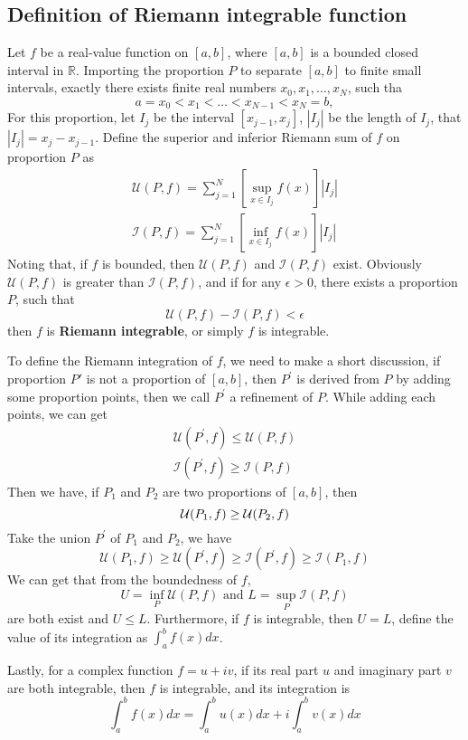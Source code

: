 \documentclass[a4paper]{article}
\begin{document}
\subsection{Definition of Riemann integrable function}
\par Let $f$ be a real-value function on $[a,b]$, where $[a,b]$ is a bounded closed interval in $\mathbb{R}$. Importing the proportion $P$ to separate $[a,b]$ to finite small intervals, exactly there exists finite real numbers $x_0, x_1, \dots, x_N$, such tha
$$a=x_0 < x_1 < \dots < x_{N-1} < x_N=b,$$
For this proportion, let $I_j$ be the interval $[x_{j-1},x_j]$, $|I_j|$ be the length of $I_j$, that $|I_j|=x_j-x_{j-1}$. Define the superior and inferior Riemann sum of $f$ on proportion $P$ as
\begin{gather}
    \mathcal{U}(P, f) = \sum_{j=1}^N [\sup_{x \in I_j} f(x)]|I_j| \\
    \mathcal{I}(P, f) = \sum_{j=1}^N [\inf_{x \in I_j} f(x)]|I_j|
\end{gather}
Noting that, if $f$ is bounded, then $\mathcal{U}(P, f)$ and $\mathcal{I}(P, f)$ exist. Obviously $\mathcal{U}(P, f)$ is greater than $\mathcal{I}(P, f)$, and if for any $\epsilon>0$, there exists a proportion $P$, such that
$$\mathcal{U}(P, f) - \mathcal{I}(P, f) < \epsilon$$
then $f$ is \textbf{Riemann integrable}, or simply $f$ is integrable.
\par To define the Riemann integration of $f$, we need to make a short discussion, if proportion $P\prime$ is not a proportion of $[a,b]$, then $P^\prime$ is derived from $P$ by adding some proportion points, then we call $P^\prime$ a refinement of $P$. While adding each points, we can get
\begin{gather}
    \mathcal{U}(P^\prime, f)\leq\mathcal{U}(P, f) \\
    \mathcal{I}(P^\prime, f)\geq\mathcal{I}(P, f)
\end{gather}
Then we have, if $P_1$ and $P_2$ are two proportions of $[a,b]$, then
\begin{equation}
    \mathcal{U}(P_1, f) \geq \mathcal{U}(P_2, f) \\
\end{equation}
Take the union $P^\prime$ of $P_1$ and $P_2$, we have
\begin{equation}
    \mathcal{U}(P_1, f) \geq \mathcal{U}(P^\prime, f) \geq \mathcal{I}(P^\prime, f) \geq \mathcal{I}(P_1, f)
\end{equation}
We can get that from the boundedness of $f$,
\begin{equation}
    U=\inf_P\mathcal{U}(P, f) \text{ and } L=\sup_P\mathcal{I}(P, f)
\end{equation}
are both exist and $U \leq L$. Furthermore, if $f$ is integrable, then $U=L$, define the value of its integration as $\int_{a}^{b}f(x)dx$.
\par Lastly, for a complex function $f=u+iv$, if its real part $u$ and imaginary part $v$ are both integrable, then $f$ is integrable, and its integration is
\begin{equation}
    \int_{a}^{b}f(x)dx = \int_{a}^{b}u(x)dx + i\int_{a}^{b}v(x)dx
\end{equation}
\end{document}
